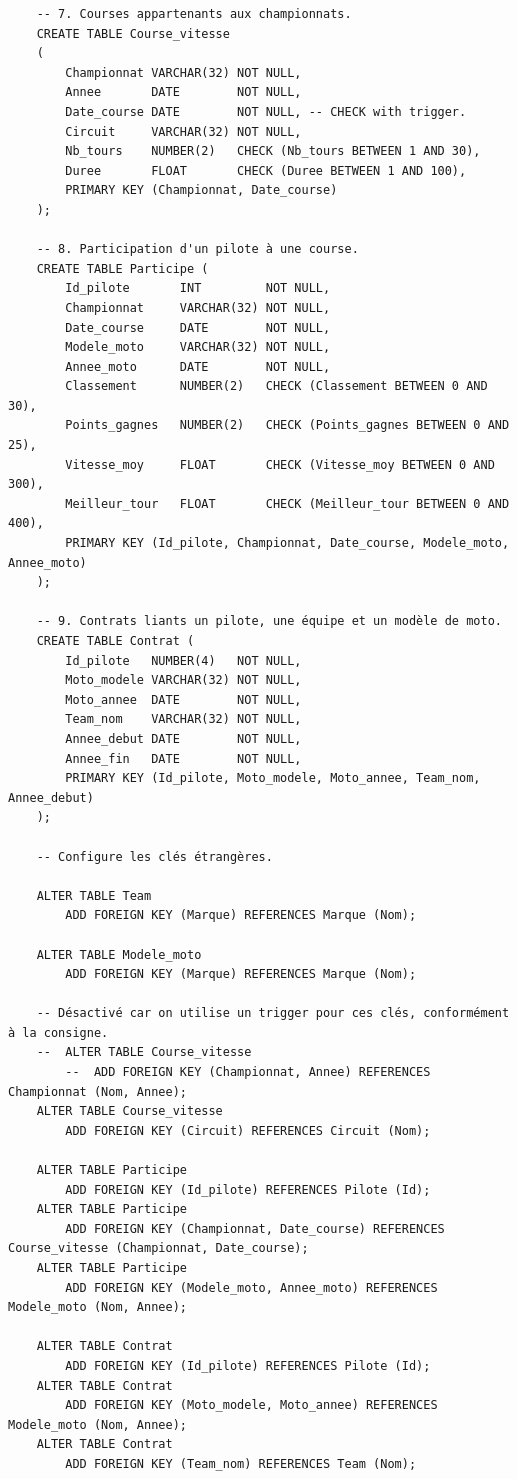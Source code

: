 \documentclass[12pt,a4paper]{article}
\newenvironment{code}{\captionsetup{type=listing}}{}
\begin{document}
\begin{code}
\begin{verbatim}
    -- 7. Courses appartenants aux championnats.
    CREATE TABLE Course_vitesse
    (
        Championnat VARCHAR(32) NOT NULL,
        Annee       DATE        NOT NULL,
        Date_course DATE        NOT NULL, -- CHECK with trigger.
        Circuit     VARCHAR(32) NOT NULL,
        Nb_tours    NUMBER(2)   CHECK (Nb_tours BETWEEN 1 AND 30),
        Duree       FLOAT       CHECK (Duree BETWEEN 1 AND 100),
        PRIMARY KEY (Championnat, Date_course)
    );

    -- 8. Participation d'un pilote à une course.
    CREATE TABLE Participe (
        Id_pilote       INT         NOT NULL,
        Championnat     VARCHAR(32) NOT NULL,
        Date_course     DATE        NOT NULL,
        Modele_moto     VARCHAR(32) NOT NULL,
        Annee_moto      DATE        NOT NULL,
        Classement      NUMBER(2)   CHECK (Classement BETWEEN 0 AND 30),
        Points_gagnes   NUMBER(2)   CHECK (Points_gagnes BETWEEN 0 AND 25),
        Vitesse_moy     FLOAT       CHECK (Vitesse_moy BETWEEN 0 AND 300),
        Meilleur_tour   FLOAT       CHECK (Meilleur_tour BETWEEN 0 AND 400),
        PRIMARY KEY (Id_pilote, Championnat, Date_course, Modele_moto, Annee_moto)
    );

    -- 9. Contrats liants un pilote, une équipe et un modèle de moto.
    CREATE TABLE Contrat (
        Id_pilote   NUMBER(4)   NOT NULL,
        Moto_modele VARCHAR(32) NOT NULL,
        Moto_annee  DATE        NOT NULL,
        Team_nom    VARCHAR(32) NOT NULL,
        Annee_debut DATE        NOT NULL,
        Annee_fin   DATE        NOT NULL,
        PRIMARY KEY (Id_pilote, Moto_modele, Moto_annee, Team_nom, Annee_debut)
    );

    -- Configure les clés étrangères.

    ALTER TABLE Team
        ADD FOREIGN KEY (Marque) REFERENCES Marque (Nom);

    ALTER TABLE Modele_moto
        ADD FOREIGN KEY (Marque) REFERENCES Marque (Nom);
        
    -- Désactivé car on utilise un trigger pour ces clés, conformément à la consigne.
    --  ALTER TABLE Course_vitesse
        --  ADD FOREIGN KEY (Championnat, Annee) REFERENCES Championnat (Nom, Annee);
    ALTER TABLE Course_vitesse
        ADD FOREIGN KEY (Circuit) REFERENCES Circuit (Nom);

    ALTER TABLE Participe
        ADD FOREIGN KEY (Id_pilote) REFERENCES Pilote (Id);
    ALTER TABLE Participe
        ADD FOREIGN KEY (Championnat, Date_course) REFERENCES Course_vitesse (Championnat, Date_course);
    ALTER TABLE Participe
        ADD FOREIGN KEY (Modele_moto, Annee_moto) REFERENCES Modele_moto (Nom, Annee);

    ALTER TABLE Contrat
        ADD FOREIGN KEY (Id_pilote) REFERENCES Pilote (Id);
    ALTER TABLE Contrat
        ADD FOREIGN KEY (Moto_modele, Moto_annee) REFERENCES Modele_moto (Nom, Annee);
    ALTER TABLE Contrat
        ADD FOREIGN KEY (Team_nom) REFERENCES Team (Nom);
    \end{verbatim}
    \caption{Code SQL permettant de mettre en place la base de données}
    \label{lst.create}
\end{code}
\end{document}
